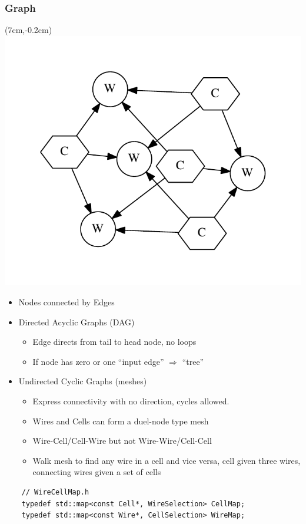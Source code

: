 \documentclass[xcolor=dvipsnames]{beamer}
\begin{document}
\begin{frame}[fragile]
  \frametitle{Graph}
  \begin{textblock*}{4cm}(7cm,-0.2cm)
    \includegraphics[width=\textwidth]{wcgraph}
  \end{textblock*}

  {

  \begin{itemize}
  \item Nodes connected by Edges
  \item Directed Acyclic Graphs (DAG)
    \begin{itemize}
    \item Edge directs from tail to head node, no loops
    \item If node has zero or one ``input edge'' $\Rightarrow$ ``tree''
    \end{itemize}
  \item Undirected Cyclic Graphs (meshes)
    \begin{itemize}
    \item Express connectivity with no direction, cycles allowed.
    \item Wires and Cells can form a duel-node type mesh
    \item Wire-Cell/Cell-Wire but not Wire-Wire/Cell-Cell
    \item Walk mesh to find any wire in a cell and vice versa, cell
      given three wires, connecting wires given a set of cells
    \end{itemize}
  \end{itemize}
}
  \begin{lstlisting}
    // WireCellMap.h
    typedef std::map<const Cell*, WireSelection> CellMap;
    typedef std::map<const Wire*, CellSelection> WireMap;
  \end{lstlisting}
\end{frame}
\end{document}
